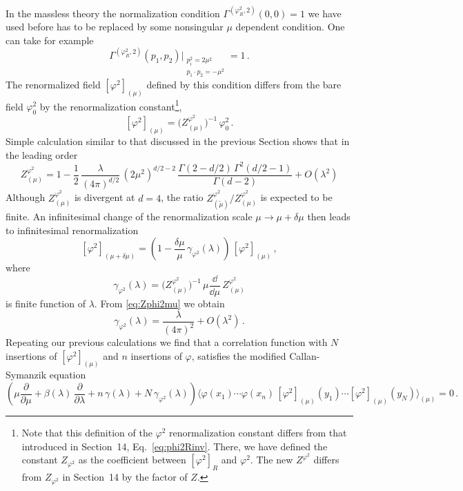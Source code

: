 In the massless theory the normalization condition
$\Gamma^{(\varphi^2_R,2)}(0,0)=1$ we have used before has to be replaced by some
nonsingular $\mu$ dependent condition. One can take for example
\begin{equation}\label{eq:phi2mu}
\Gamma^{(\varphi^2_R,2)}(p_1,p_2)\Big|_{\substack{p_i^2=2\mu^2\\p_1\cdot p_2=-\mu^2}}=1\,.
\end{equation}
The renormalized field $[\varphi^2]_{(\mu)}$ defined by this condition differs
from the bare field $\varphi_0^2$ by the renormalization
constant\footnote{Note that this definition of the $\varphi^2$ renormalization
constant differs from that introduced in Section~14, Eq.~\eqref{eq:phi2Rinv}.
There, we have defined the constant $Z_{\varphi^2}$ as the coefficient between
$[\varphi^2]_R$ and $\varphi^2$. The new $Z^{\varphi^2}$ differs from
$Z_{\varphi^2}$ in Section~14 by the factor of $Z$.},
\[
[\varphi^2]_{(\mu)}=\bigl(Z^{\varphi^2}_{(\mu)}\bigr)^{-1}\,\varphi_0^2\,.
\]
Simple calculation similar to that discussed in the previous Section shows that
in the leading order
\begin{equation}\label{eq:Zphi2mu}
Z^{\varphi^2}_{(\mu)}=1-\frac12\,\frac\lambda{(4\pi)^{d/2}}\,(2\mu^2)^{d/2-2}\,\frac{\Gamma(2-d/2)\,\Gamma^2(d/2-1)}{\Gamma(d-2)}+O(\lambda^2)
\end{equation}
Although $Z^{\varphi^2}_{(\mu)}$ is divergent at $d=4$, the ratio
$Z^{\varphi^2}_{(\tilde\mu)}/Z^{\varphi^2}_{(\mu)}$ is expected to be finite. An
infinitesimal change of the renormalization scale $\mu\to\mu+\delta\mu$ then leads
to infinitesimal renormalization
\[
[\varphi^2]_{(\mu+\delta\mu)}=\left(1-\frac{\delta\mu}\mu\,\gamma_{\varphi^2}(\lambda)\right)\,[\varphi^2]_{(\mu)}\,,
\]
where
\begin{equation}\label{eq:gammaphi2}
\gamma_{\varphi^2}(\lambda)=\bigl(Z^{\varphi^2}_{(\mu)}\bigr)^{-1}\,\mu\frac{\dd}{\dd\mu}\,Z^{\varphi^2}_{(\mu)}
\end{equation}
is finite function of $\lambda$. From \eqref{eq:Zphi2mu} we obtain
\begin{equation}\label{eq:gammaphi2val}
\gamma_{\varphi^2}(\lambda)=\frac\lambda{(4\pi)^2}+O(\lambda^2)\,.
\end{equation}
Repeating our previous calculations we find that a correlation function with $N$
insertions of $[\varphi^2]_{(\mu)}$ and $n$ insertions of $\varphi$, satisfies the
modified Callan-Symanzik equation
\[
\left(\mu\frac\partial{\partial\mu}+\beta(\lambda)\,\frac\partial{\partial\lambda}+n\,\gamma(\lambda)+N\,\gamma_{\varphi^2}(\lambda)\right)
\bigl\langle\varphi(x_1)\cdots\varphi(x_n)\,[\varphi^2]_{(\mu)}(y_1)\cdots[\varphi^2]_{(\mu)}(y_N)\bigr\rangle_{(\mu)}=0\,.
\]

